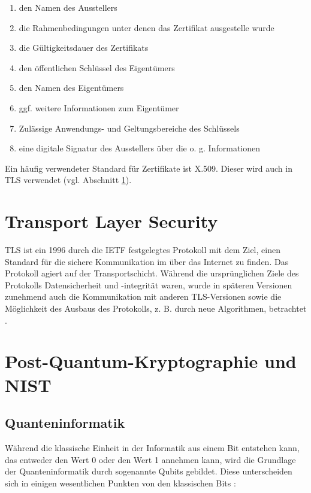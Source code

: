 		\begin{enumerate}
			\item den Namen des Ausstellers
			\item die Rahmenbedingungen unter denen das Zertifikat ausgestelle wurde
			\item die Gültigkeitsdauer des Zertifikats
			\item den öffentlichen Schlüssel des Eigentümers
			\item den Namen des Eigentümers
			\item ggf. weitere Informationen zum Eigentümer
			\item Zulässige Anwendungs- und Geltungsbereiche des Schlüssels
			\item eine digitale Signatur des Ausstellers über die o. g. Informationen
		\end{enumerate}
	
		Ein häufig verwendeter Standard für Zertifikate ist X.509. Dieser wird auch in TLS verwendet (vgl. Abschnitt \ref{sec:grundlagen:tls}).
	
	\section{Transport Layer Security}
	\label{sec:grundlagen:tls}
	
	TLS ist ein 1996 durch die \ac{IETF} festgelegtes Protokoll mit dem Ziel, einen Standard für die sichere Kommunikation im über das Internet zu finden. Das Protokoll agiert auf der Transportschicht. Während die ursprünglichen Ziele des Protokolls Datensicherheit und -integrität waren, wurde in späteren Versionen zunehmend auch die Kommunikation mit anderen TLS-Versionen sowie die Möglichkeit des Ausbaus des Protokolls, z. B. durch neue Algorithmen, betrachtet \cite{Kizza2020}.
	
	\section{Post-Quantum-Kryptographie und NIST}
	\label{sec:grundlagen:pqc}
	
		\subsection{Quanteninformatik}
		\label{subsec:grundlagen:pqc:quantencomputer}
	
		Während die klassische Einheit in der Informatik aus einem Bit entstehen kann, das entweder den Wert 0 oder den Wert 1 annehmen kann, wird die Grundlage der Quanteninformatik durch sogenannte Qubits gebildet. Diese unterscheiden sich in einigen wesentlichen Punkten von den klassischen Bits \cite{Just2020}:
		
